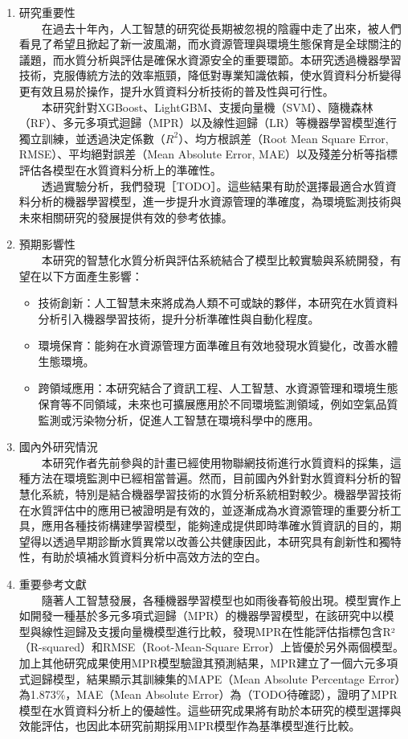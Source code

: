 \documentclass[12pt,a4paper]{article}
\begin{document}
\begin{enumerate}
\begin{enumerate}[label=\arabic*.]
\item 研究重要性\\
　　在過去十年內，人工智慧的研究從長期被忽視的陰霾中走了出來，被人們看見了希望且掀起了新一波風潮\cite{ref2}，而水資源管理與環境生態保育是全球關注的議題，而水質分析與評估是確保水資源安全的重要環節。本研究透過機器學習技術，克服傳統方法的效率瓶頸，降低對專業知識依賴，使水質資料分析變得更有效且易於操作，提升水質資料分析技術的普及性與可行性。\\  
　　本研究針對XGBoost、LightGBM、支援向量機（SVM）、隨機森林（RF）、多元多項式迴歸（MPR）以及線性迴歸（LR）等機器學習模型進行獨立訓練，並透過決定係數（$R^2$）、均方根誤差（Root Mean Square Error, RMSE）、平均絕對誤差（Mean Absolute Error, MAE）以及殘差分析等指標評估各模型在水質資料分析上的準確性。\\  
　　透過實驗分析，我們發現［TODO］。這些結果有助於選擇最適合水質資料分析的機器學習模型，進一步提升水資源管理的準確度，為環境監測技術與未來相關研究的發展提供有效的參考依據。
\item 預期影響性\\
　　本研究的智慧化水質分析與評估系統結合了模型比較實驗與系統開發，有望在以下方面產生影響：
    \begin{itemize}
    \item 技術創新：人工智慧未來將成為人類不可或缺的夥伴\cite{ref3}，本研究在水質資料分析引入機器學習技術，提升分析準確性與自動化程度。
    \item 環境保育：能夠在水資源管理方面準確且有效地發現水質變化，改善水體生態環境。
    \item 跨領域應用：本研究結合了資訊工程、人工智慧、水資源管理和環境生態保育等不同領域，未來也可擴展應用於不同環境監測領域，例如空氣品質監測或污染物分析，促進人工智慧在環境科學中的應用。
    \end{itemize}
\item 國內外研究情況\\
　　本研究作者先前參與的計畫已經使用物聯網技術進行水質資料的採集，這種方法在環境監測中已經相當普遍。然而，目前國內外針對水質資料分析的智慧化系統，特別是結合機器學習技術的水質分析系統相對較少。機器學習技術在水質評估中的應用已被證明是有效的，並逐漸成為水資源管理的重要分析工具\cite{ref4}，應用各種技術構建學習模型，能夠達成提供即時準確水質資訊的目的，期望得以透過早期診斷水質異常以改善公共健康\cite{ref5}因此，本研究具有創新性和獨特性，有助於填補水質資料分析中高效方法的空白。
\item 重要參考文獻\\
　　隨著人工智慧發展，各種機器學習模型也如雨後春筍般出現。模型實作上如開發一種基於多元多項式迴歸（MPR）的機器學習模型，在該研究中以模型與線性迴歸及支援向量機模型進行比較，發現MPR在性能評估指標包含R²（R-squared）和RMSE（Root-Mean-Square Error）上皆優於另外兩個模型\cite{ref6}。加上其他研究成果使用MPR模型驗證其預測結果\cite{ref7}，MPR建立了一個六元多項式迴歸模型，結果顯示其訓練集的MAPE（Mean Absolute Percentage Error）為1.873\%，MAE（Mean Absolute Error）為（TODO待確認），證明了MPR模型在水質資料分析上的優越性\cite{ref8}。這些研究成果將有助於本研究的模型選擇與效能評估，也因此本研究前期採用MPR模型作為基準模型進行比較。\\

\end{enumerate}
\end{enumerate}
\end{document}

